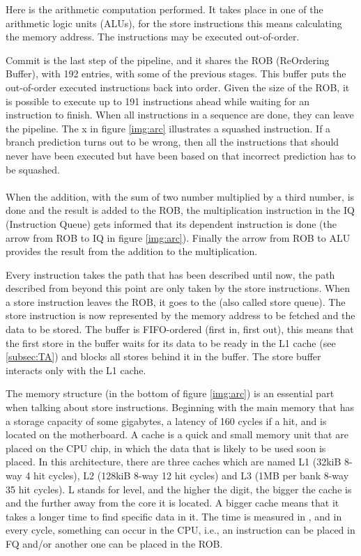 Here is the arithmetic computation performed. It takes place in one of the arithmetic logic units (ALUs), for the store instructions this means calculating the memory address. The instructions may be executed out-of-order. 

Commit is the last step of the pipeline, and it shares the ROB (ReOrdering Buffer),
with 192 entries, with some of the previous stages. This buffer puts the out-of-order executed instructions back into
order. Given the size of the ROB, it is possible to execute up to 191 instructions ahead while waiting for an instruction to finish. When 
 all instructions in a sequence are done, they can leave the pipeline. The {\color{red}x} in figure
\ref{img:arc} illustrates a squashed instruction. If a branch prediction turns out to be wrong,
then all the instructions that should never have been executed but
have been based on that incorrect prediction has to be squashed.
\\ \\
 When the addition, with the sum of two number multiplied by a third number, is
 done and the result is added to the ROB, the multiplication instruction in the IQ
(Instruction Queue) gets informed that its dependent instruction is done (the arrow
from ROB to IQ in figure \ref{img:arc}). Finally the arrow from ROB to ALU provides the
result from the addition to the multiplication.

 Every instruction takes the path that has been described until now, the path described from beyond this point are only taken by the store instructions. When a store instruction leaves the ROB, it goes to the  (also called store queue). The store instruction is now represented by the memory address to be fetched and the data to be stored. The buffer is FIFO-ordered (first in, first out), this means that the first store in the buffer waits for its data to be ready in the L1 cache (see \ref{subsec:TA}) and blocks all stores behind it in the buffer. The store buffer interacts only with the L1 cache.

The memory structure (in the bottom of figure \ref{img:arc}) is an essential part when talking about store instructions. Beginning with the main memory that has a storage capacity of some gigabytes, a latency of 160 cycles if a hit, and is located on the motherboard. A cache is a quick and small memory unit that are placed on the CPU chip, in which the data that is likely to be used soon is placed. In this architecture, there are three caches which are named L1 (32kiB 8-way 4 hit cycles), L2 (128kiB 8-way 12 hit cycles) and L3 (1MB per bank 8-way 35 hit cycles). L stands for level, and the higher the digit, the bigger the cache is and the further away from the core it is located. A bigger cache means that it takes a longer time to find specific data in it. The time is measured in , and in every cycle, something can occur in the CPU, i.e., an instruction can be placed in FQ and/or another one can be placed in the ROB. 

